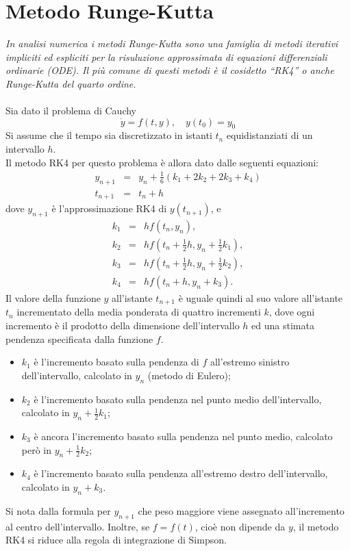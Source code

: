\chapter{\huge Metodo Runge-Kutta}

\textit{In analisi numerica i metodi Runge-Kutta sono una famiglia di metodi iterativi impliciti ed espliciti per la risuluzione approssimata di equazioni differenziali ordinarie (ODE). Il più comune di questi metodi è il cosidetto ``RK4'' o anche Runge-Kutta del quarto ordine.}
\\\\
Sia dato il problema di Cauchy
$$ \dot y = f(t, y), \quad y(t_0) = y_0$$
Si assume che il tempo sia discretizzato in istanti $t_n$ equidistanziati di un intervallo $h$.\\
Il metodo RK4 per questo problema è allora dato dalle seguenti equazioni:
\begin{eqnarray*}
y_{n+1} &=& y_n + \tfrac{1}{6} \left(k_1 + 2k_2 + 2k_3 + k_4 \right)\\
t_{n+1} &=& t_n + h
\end{eqnarray*}
dove $y_{n+1}$ è l'approssimazione RK4 di $y(t_{n+1})$, e
\begin{eqnarray*}
k_1 &=& hf(t_n, y_n),\\
k_2 &=& hf(t_n + \tfrac{1}{2}h , y_n + \tfrac{1}{2} k_1),\\
k_3 &=& hf(t_n + \tfrac{1}{2}h , y_n + \tfrac{1}{2} k_2),\\
k_4 &=& hf(t_n + h , y_n + k_3).
\end{eqnarray*}
Il valore della funzione $y$ all'istante $t_{n+1}$ è uguale quindi al suo valore all'istante $t_n$ incrementato della media ponderata di quattro incrementi $k$, dove ogni incremento è il prodotto della dimensione dell'intervallo $h$ ed una stimata pendenza specificata dalla funzione $f$.
\begin{itemize}
\item $k_1$ è l'incremento basato sulla pendenza di $f$ all'estremo sinistro dell'intervallo, calcolato in $y_n$ (metodo di Eulero);
\item $k_2$ è l'incremento basato sulla pendenza nel punto medio dell'intervallo, calcolato in $y_n+\frac{1}{2}k_1$;
\item $k_3$ è ancora l'incremento basato sulla pendenza nel punto medio, calcolato però in $y_n+\frac{1}{2}k_2$;
\item $k_4$ è l'incremento basato sulla pendenza all'estremo destro dell'intervallo, calcolato in $y_n+k_3$.
\end{itemize}
Si nota dalla formula per $y_{n+1}$ che peso maggiore viene assegnato all'incremento al centro dell'intervallo. Inoltre, se $f=f(t)$, cioè non dipende da $y$, il metodo RK4 si riduce alla regola di integrazione di Simpson.

